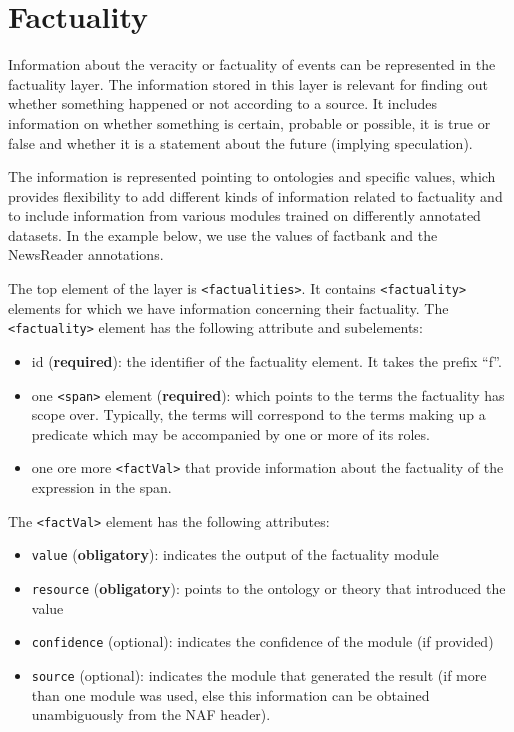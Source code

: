 \section{Factuality}
\label{sec:factuality}

Information about the veracity or factuality of events can be represented in the factuality layer. The information stored in this layer is relevant for finding out whether something happened or not according to a source. It includes information on whether something is certain, probable or possible, it is true or false and whether it is a statement about the future (implying speculation).

The  information is represented pointing to ontologies and specific values, which provides flexibility to add different kinds of information related to factuality and to include information from various modules trained on differently annotated datasets. In the example below, we use the values of factbank and the NewsReader annotations.

The top element of the layer is {\tt <factualities>}. It contains {\tt <factuality>} elements for which we have information concerning their factuality. The \texttt{<factuality>} element has the following attribute and subelements:

\begin{itemize}
\item id (\textbf{required}): the identifier of the factuality element. It takes the prefix ``f''.
\item one {\tt <span>} element (\textbf{required}): which points to the terms the factuality has scope over. Typically, the terms will correspond to the terms making up a predicate which may be accompanied by one or more of its roles. 
\item one ore more {\tt <factVal>} that provide information about the factuality of the expression in the span.
\end{itemize}

The {\tt <factVal>} element has the following attributes:

\begin{itemize}
\item \texttt{value} (\textbf{obligatory}): indicates the output of the factuality module
\item \texttt{resource} (\textbf{obligatory}): points to the ontology or theory that introduced the value
\item \texttt{confidence} (optional): indicates the confidence of the module (if provided)
\item \texttt{source} (optional): indicates the module that generated the result (if more than one module was used, else this information can be obtained unambiguously from the NAF header).
\end{itemize}

